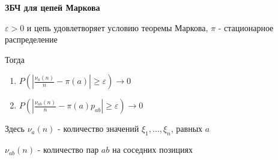 \begin{theorem}
    \textbf{ЗБЧ для цепей Маркова}

    $\varepsilon > 0$ и цепь удовлетворяет условию теоремы Маркова, $\pi$ - стационарное распределение  
    
    Тогда 
    \begin{enumerate}
        \item $P\left( \left| \frac{\nu_a (n)}{n} - \pi (a) \right| \geqslant \varepsilon \right) \rightarrow 0$
        \item $P\left( \left| \frac{\nu_{ab} (n)}{n} - \pi (a) p_{ab} \right| \geqslant \varepsilon \right) \rightarrow 0$
    \end{enumerate}

    Здесь $\nu_a (n)$ - количество значений $\xi_1, \ldots, \xi_n$, равных $a$
    
    $\nu_{ab} (n)$ - количество пар $ab$ на соседних позициях
\end{theorem}

